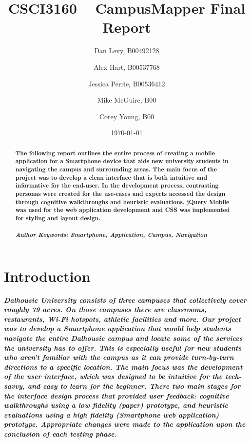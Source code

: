 \documentclass{report}
\title{CSCI3160 -- CampusMapper Final Report}
\author{Dan Levy, B00492128 \and Alex Hart, B00537768 \and Jessica Perrie,
B00536412 \and Mike McGuire, B00 \and Corey Young, B00}
\date{\today}
\begin{document}
\maketitle
\tableofcontents
\listoffigures
\begin{abstract}
    \paragraph{The following report outlines the entire process of creating a
    mobile application for a Smartphone device that aids new university students in
    navigating the campus and surrounding areas. The main focus of the project was
    to develop a clean interface that is both intuitive and informative for the
    end-user. In the development process, contrasting personas were created for the
    use-cases and experts accessed the design through cognitive walkthroughs and
    heuristic evaluations. jQuery Mobile was used for the web application
    development and CSS was implemented for styling and layout design.}
    \paragraph{\emph{Author Keywords: Smartphone, Application, Campus, Navigation}}
\end{abstract}
\chapter{Introduction}
    \paragraph{Dalhousie University consists of three campuses that collectively
    cover roughly 79 acres. On those campuses there are classrooms, restaurants,
    Wi-Fi hotspots, athletic facilities and more. Our project was to develop a
    Smartphone application that would help students navigate the entire Dalhousie
    campus and locate some of the services the university has to offer. This is
    especially useful for new students who aren’t familiar with the campus as it can
    provide turn-by-turn directions to a specific location. The main focus was the
    development of the user interface, which was designed to be intuitive for the
    tech-savvy, and easy to learn for the beginner. There two main stages for the
    interface design process that provided user feedback: cognitive walkthroughs
    using a low fidelity (paper) prototype, and heuristic evaluations using a high
    fidelity (Smartphone web application) prototype. Appropriate changes were made
    to the application upon the conclusion of each testing phase.}
\end{document}

